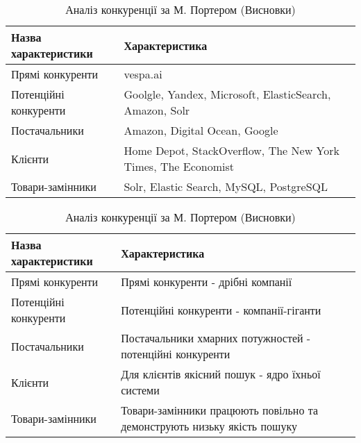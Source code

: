 \begin{table}
  \begin{tabular}
    {|l|p{10cm}|} \hline
    \bf{Назва характеристики} & \bf{Характеристика} \\ \hline
    Прямі конкуренти & vespa.ai \\ \hline
    Потенційні конкуренти & Goolgle, Yandex, Microsoft, ElasticSearch, Amazon, Solr \\ \hline
    Постачальники & Amazon, Digital Ocean, Google \\ \hline
    Клієнти & Home Depot, StackOverflow, The New York Times, The Economist \\ \hline
    Товари-замінники & Solr, Elastic Search, MySQL, PostgreSQL \\ \hline
  \end{tabular}
  \caption{Аналіз конкуренції за М. Портером (Складові аналізу)}
  \begin{tabular}
    {|l|p{10cm}|} \hline
    \bf{Назва характеристики} & \bf{Характеристика} \\ \hline
    Прямі конкуренти & Прямі конкуренти - дрібні компанії \\ \hline
    Потенційні конкуренти & Потенційні конкуренти - компанії-гіганти \\ \hline
    Постачальники & Постачальники хмарних потужностей - потенційні конкуренти\\ \hline
    Клієнти & Для клієнтів якісний пошук - ядро їхньої системи \\ \hline
    Товари-замінники & Товари-замінники працюють повільно та демонструють низьку якість пошуку \\ \hline
  \end{tabular}
  \caption{Аналіз конкуренції за М. Портером (Висновки)}

\end{table}

